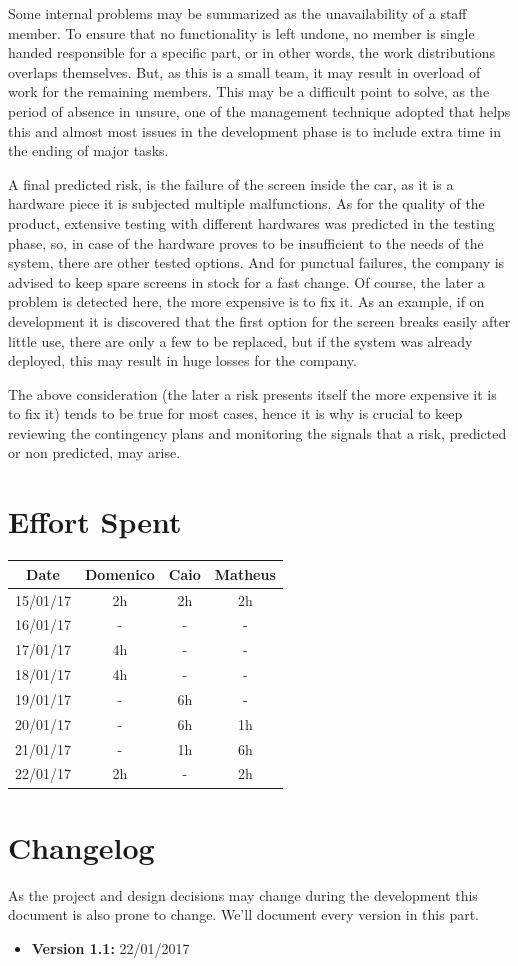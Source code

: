 \documentclass[a4paper]{article}
\begin{document}
Some internal problems may be summarized as the unavailability of a staff member. To ensure that no functionality is left undone, no member is single handed responsible for a specific part, or in other words, the work distributions overlaps themselves.  But, as this is a small team, it may result in overload of work for the remaining members. This may be a difficult point to solve, as the period of absence in unsure, one of the management technique adopted that helps this and almost most issues in the development phase is to include extra time in the ending of major tasks.      

A final predicted risk, is the failure of the screen inside the car, as it is a hardware piece it is subjected multiple malfunctions. As for the quality of the product, extensive testing with different hardwares was predicted in the testing phase, so, in case of the hardware proves to be insufficient to the needs of the system, there are other tested options. And for punctual failures, the company is advised to keep spare screens in stock for a fast change. Of course, the later a problem is detected here, the more expensive is to fix it. As an example, if on development it is discovered that the first option for the screen breaks easily after little use, there are only a few to be replaced, but if the system was already deployed, this may result in huge losses for the company. 

The above consideration (the later a risk presents itself the more expensive it is to fix it) tends to be true for most cases, hence it is why is crucial to keep reviewing the contingency plans and monitoring the signals that a risk, predicted or non predicted, may arise. 


\newpage
\section{Effort Spent}
\begin{tabular}{ | c | c | c | c | }
\hline
	\textbf {Date} & \textbf {Domenico} & \textbf {Caio} & \textbf {Matheus} \\ \hline
	15/01/17& 2h & 2h & 2h  \\ \hline
	16/01/17& - & - & - \\ \hline
	17/01/17& 4h & - & - \\ \hline
	18/01/17& 4h & - & - \\ \hline
	19/01/17& - & 6h & - \\ \hline
	20/01/17& - & 6h & 1h \\ \hline
	21/01/17& - & 1h & 6h \\ \hline
	22/01/17& 2h & - & 2h \\ \hline
\end{tabular}
\newpage

\section{Changelog}
As the project and design decisions may change during the development this document is also prone to change.
We'll document every version in this part.
\begin{itemize}
\item \textbf {Version 1.1:} 22/01/2017
\end{itemize}
\end{document}
